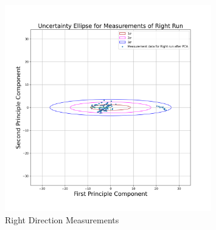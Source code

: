     \begin{figure}[!ht] 
            \centering 
            \includegraphics[width=0.8\textwidth]{"images/experiment_3/Uncertainty Ellipse for Measurements of Right Run.png"}
            \caption{Right Direction Measurements}
            \label{fig:ellipserightafter}
    \end{figure}
    
